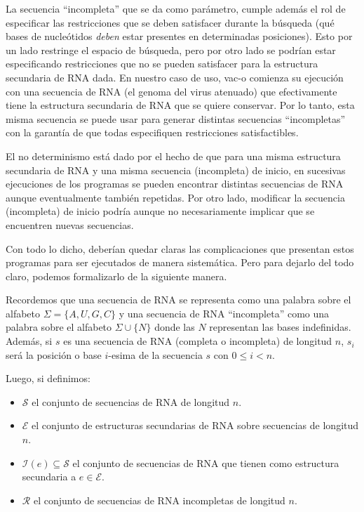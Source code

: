 La secuencia ``incompleta'' que se da como par\'ametro, cumple adem\'as el rol
de especificar las restricciones que se deben satisfacer durante la b\'usqueda
(qu\'e bases de nucle\'otidos \textit{deben} estar presentes en determinadas
posiciones). Esto por un lado restringe el espacio de b\'usqueda, pero por otro
lado se podr\'ian estar especificando restricciones que no se pueden satisfacer
para la estructura secundaria de \ac{RNA} dada. En nuestro caso de uso,
\ac{vac-o} comienza su ejecuci\'on con una secuencia de \ac{RNA} (el genoma del
virus atenuado) que efectivamente tiene la estructura secundaria de \ac{RNA} que
se quiere conservar. Por lo tanto, esta misma secuencia se puede usar para
generar distintas secuencias ``incompletas'' con la garant\'ia de que todas
especifiquen restricciones satisfactibles.

El no determinismo est\'a dado por el hecho de que para una misma estructura
secundaria de \ac{RNA} y una misma secuencia (incompleta) de inicio, en
sucesivas ejecuciones de los programas se pueden encontrar distintas secuencias
de \ac{RNA} aunque eventualmente tambi\'en repetidas. Por otro lado, modificar
la secuencia (incompleta) de inicio podr\'ia aunque no necesariamente implicar
que se encuentren nuevas secuencias.

Con todo lo dicho, deber\'ian quedar claras las complicaciones que presentan
estos programas para ser ejecutados de manera sistem\'atica. Pero para dejarlo
del todo claro, podemos formalizarlo de la siguiente manera.

Recordemos que una secuencia de \ac{RNA} se representa como una palabra sobre el
alfabeto $\Sigma = \{A,U,G,C\}$ y una secuencia de \ac{RNA} ``incompleta'' como
una palabra sobre el alfabeto $\Sigma \cup \{N\}$ donde las $N$ representan las
bases indefinidas. Adem\'as, si $s$ es una secuencia de \ac{RNA} (completa o
incompleta) de longitud $n$, $s_{i}$ ser\'a la posici\'on o base $i$-esima de la
secuencia $s$ con $0 \leq i < n$.

Luego, si definimos:
\begin{itemize}
 \item $\mathcal{S}$ el conjunto de secuencias de \ac{RNA} de longitud $n$.
 \item $\mathcal{E}$ el conjunto de estructuras secundarias de \ac{RNA} sobre
secuencias de longitud $n$. 
 \item $\mathcal{I}(e) \subseteq \mathcal{S}$ el conjunto de secuencias de
\ac{RNA} que tienen como estructura secundaria a $e \in \mathcal{E}$.
 \item $\mathcal{R}$ el conjunto de secuencias de \ac{RNA} incompletas de
longitud $n$.
\end{itemize}

